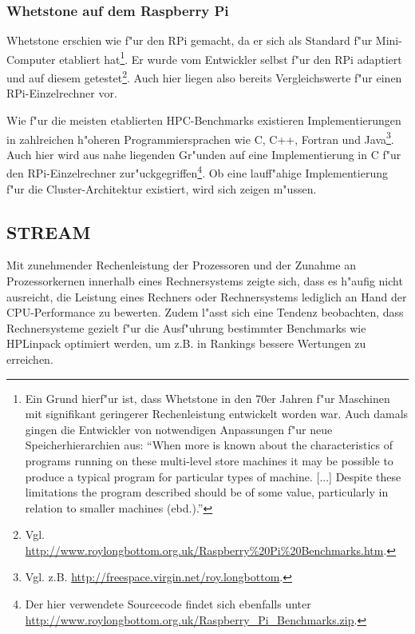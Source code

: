 \subsubsection{Whetstone auf dem Raspberry Pi}\label{Whetstone RPi}

Whetstone erschien wie f"ur den RPi gemacht, da er sich als Standard f"ur Mini-Computer etabliert hat\footnote{Ein Grund hierf"ur ist, dass Whetstone in den 70er Jahren f"ur Maschinen mit signifikant geringerer Rechenleistung entwickelt worden war. Auch damals gingen die Entwickler von notwendigen Anpassungen f"ur neue Speicherhierarchien aus: "`When more is known about the characteristics of programs running on these multi-level store machines it may be possible to produce a typical program for particular types of machine. [...] Despite these limitations the program described should be of some value, particularly in relation to smaller machines (ebd.)."'}. Er wurde vom Entwickler selbst f"ur den RPi adaptiert und auf diesem getestet\footnote{Vgl. \url{http://www.roylongbottom.org.uk/Raspberry\%20Pi\%20Benchmarks.htm}.}. Auch hier liegen also bereits Vergleichswerte f"ur einen RPi-Einzelrechner vor. 

Wie f"ur die meisten etablierten HPC-Benchmarks existieren Implementierungen in zahlreichen h"oheren Programmiersprachen wie C, C++, Fortran und Java\footnote{Vgl. z.B. \url{http://freespace.virgin.net/roy.longbottom}.}. Auch hier wird aus nahe liegenden Gr"unden auf eine Implementierung in C f"ur den RPi-Einzelrechner zur"uckgegriffen\footnote{Der hier verwendete Sourcecode findet sich ebenfalls unter \url{http://www.roylongbottom.org.uk/Raspberry_Pi_Benchmarks.zip}.}. Ob eine lauff"ahige Implementierung f"ur die Cluster-Architektur existiert, wird sich zeigen m"ussen. 

\subsection{STREAM}\label{STREAM}

Mit zunehmender Rechenleistung der Prozessoren und der Zunahme an Prozessorkernen innerhalb eines Rechnersystems zeigte sich, dass es h"aufig nicht ausreicht, die Leistung eines Rechners oder Rechnersystems lediglich an Hand der CPU-Performance zu bewerten. Zudem l"asst sich eine Tendenz beobachten, dass Rechnersysteme gezielt f"ur die Ausf"uhrung bestimmter Benchmarks wie HPLinpack optimiert werden, um z.B. in Rankings bessere Wertungen zu erreichen. 

